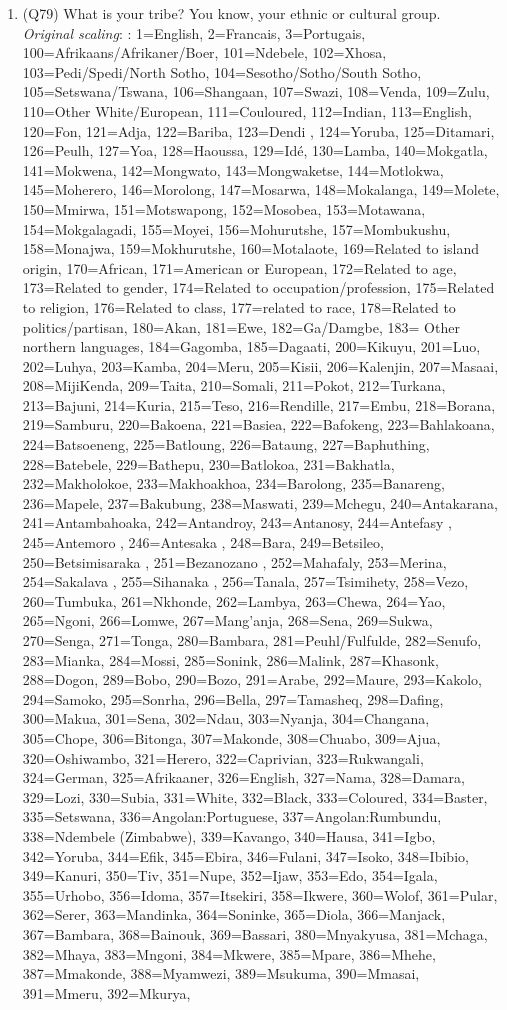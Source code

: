 \documentclass[]{article}
\begin{document}
\begin{enumerate}
  \item (Q79) What is your tribe? You know, your ethnic or cultural group. \\ \textit{Original scaling}: : 1=English, 2=Francais, 3=Portugais, 100=Afrikaans/Afrikaner/Boer, 101=Ndebele, 102=Xhosa, 103=Pedi/Spedi/North Sotho, 104=Sesotho/Sotho/South Sotho, 105=Setswana/Tswana, 106=Shangaan, 107=Swazi,  108=Venda, 109=Zulu, 110=Other White/European, 111=Couloured, 112=Indian, 113=English, 120=Fon, 121=Adja, 122=Bariba, 123=Dendi , 124=Yoruba, 125=Ditamari, 126=Peulh, 127=Yoa, 128=Haoussa, 129=Idé, 130=Lamba, 140=Mokgatla, 141=Mokwena, 142=Mongwato, 143=Mongwaketse, 144=Motlokwa, 145=Moherero, 146=Morolong, 147=Mosarwa, 148=Mokalanga, 149=Molete, 150=Mmirwa, 151=Motswapong, 152=Mosobea, 153=Motawana, 154=Mokgalagadi, 155=Moyei, 156=Mohurutshe, 157=Mombukushu, 158=Monajwa, 159=Mokhurutshe, 160=Motalaote, 169=Related to island origin, 170=African, 171=American or European, 172=Related to age, 173=Related to gender, 174=Related to occupation/profession, 175=Related to religion, 176=Related to class, 177=related to race, 178=Related to politics/partisan, 180=Akan, 181=Ewe, 182=Ga/Damgbe, 183= Other northern languages, 184=Gagomba, 185=Dagaati, 200=Kikuyu, 201=Luo, 202=Luhya, 203=Kamba, 204=Meru, 205=Kisii, 206=Kalenjin, 207=Masaai, 208=MijiKenda, 209=Taita, 210=Somali, 211=Pokot, 212=Turkana, 213=Bajuni, 214=Kuria, 215=Teso, 216=Rendille, 217=Embu, 218=Borana, 219=Samburu, 220=Bakoena, 221=Basiea, 222=Bafokeng, 223=Bahlakoana, 224=Batsoeneng, 225=Batloung, 226=Bataung, 227=Baphuthing, 228=Batebele, 229=Bathepu, 230=Batlokoa, 231=Bakhatla, 232=Makholokoe, 233=Makhoakhoa, 234=Barolong, 235=Banareng, 236=Mapele, 237=Bakubung, 238=Maswati, 239=Mchegu, 240=Antakarana, 241=Antambahoaka, 242=Antandroy, 243=Antanosy, 244=Antefasy , 245=Antemoro , 246=Antesaka , 248=Bara, 249=Betsileo, 250=Betsimisaraka , 251=Bezanozano , 252=Mahafaly, 253=Merina, 254=Sakalava , 255=Sihanaka , 256=Tanala, 257=Tsimihety, 258=Vezo, 260=Tumbuka, 261=Nkhonde, 262=Lambya, 263=Chewa, 264=Yao, 265=Ngoni, 266=Lomwe, 267=Mang’anja, 268=Sena, 269=Sukwa, 270=Senga, 271=Tonga, 280=Bambara, 281=Peuhl/Fulfulde, 282=Senufo, 283=Mianka, 284=Mossi, 285=Sonink, 286=Malink, 287=Khasonk, 288=Dogon, 289=Bobo, 290=Bozo, 291=Arabe, 292=Maure, 293=Kakolo, 294=Samoko, 295=Sonrha, 296=Bella, 297=Tamasheq, 298=Dafing, 300=Makua, 301=Sena, 302=Ndau, 303=Nyanja, 304=Changana, 305=Chope, 306=Bitonga, 307=Makonde, 308=Chuabo, 309=Ajua, 320=Oshiwambo, 321=Herero, 322=Caprivian, 323=Rukwangali, 324=German, 325=Afrikaaner, 326=English, 327=Nama, 328=Damara, 329=Lozi, 330=Subia, 331=White, 332=Black, 333=Coloured, 334=Baster, 335=Setswana, 336=Angolan:Portuguese, 337=Angolan:Rumbundu, 338=Ndembele (Zimbabwe), 339=Kavango, 340=Hausa, 341=Igbo, 342=Yoruba, 344=Efik, 345=Ebira, 346=Fulani, 347=Isoko, 348=Ibibio, 349=Kanuri, 350=Tiv, 351=Nupe, 352=Ijaw, 353=Edo, 354=Igala, 355=Urhobo, 356=Idoma, 357=Itsekiri, 358=Ikwere, 360=Wolof, 361=Pular, 362=Serer, 363=Mandinka, 364=Soninke, 365=Diola, 366=Manjack, 367=Bambara, 368=Bainouk, 369=Bassari, 380=Mnyakyusa, 381=Mchaga, 382=Mhaya, 383=Mngoni, 384=Mkwere, 385=Mpare, 386=Mhehe, 387=Mmakonde, 388=Myamwezi, 389=Msukuma, 390=Mmasai, 391=Mmeru, 392=Mkurya, 
\end{enumerate}
\end{document}
